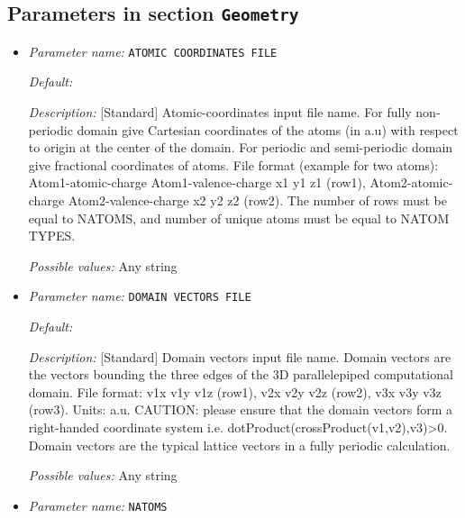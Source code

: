 \subsection{Parameters in section \tt Geometry}
\label{parameters:Geometry}

\begin{itemize}
\item {\it Parameter name:} {\tt ATOMIC COORDINATES FILE}
\label{parameters:Geometry/ATOMIC COORDINATES FILE}
\label{parameters:Geometry/ATOMIC_20COORDINATES_20FILE}




{\it Default:} 


{\it Description:} [Standard] Atomic-coordinates input file name. For fully non-periodic domain give Cartesian coordinates of the atoms (in a.u) with respect to origin at the center of the domain. For periodic and semi-periodic domain give fractional coordinates of atoms. File format (example for two atoms): Atom1-atomic-charge Atom1-valence-charge x1 y1 z1 (row1), Atom2-atomic-charge Atom2-valence-charge x2 y2 z2 (row2). The number of rows must be equal to NATOMS, and number of unique atoms must be equal to NATOM TYPES.


{\it Possible values:} Any string
\item {\it Parameter name:} {\tt DOMAIN VECTORS FILE}
\label{parameters:Geometry/DOMAIN VECTORS FILE}
\label{parameters:Geometry/DOMAIN_20VECTORS_20FILE}




{\it Default:} 


{\it Description:} [Standard] Domain vectors input file name. Domain vectors are the vectors bounding the three edges of the 3D parallelepiped computational domain. File format: v1x v1y v1z (row1), v2x v2y v2z (row2), v3x v3y v3z (row3). Units: a.u. CAUTION: please ensure that the domain vectors form a right-handed coordinate system i.e. dotProduct(crossProduct(v1,v2),v3)>0. Domain vectors are the typical lattice vectors in a fully periodic calculation.


{\it Possible values:} Any string
\item {\it Parameter name:} {\tt NATOMS}
\label{parameters:Geometry/NATOMS}





\end{itemize}
